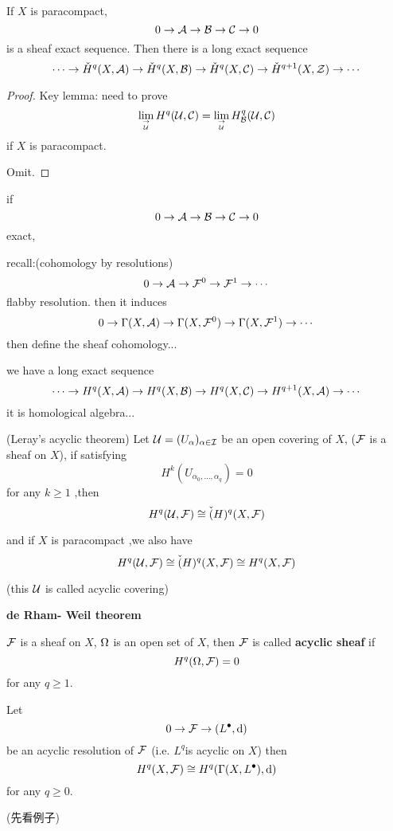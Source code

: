 \begin{thm}
If $X$ is paracompact,
$$0\to\mathcal{A}\to\mathcal{B}\to\mathcal{C}\to 0$$
is a sheaf exact sequence.
Then there is a long exact sequence
$$
\cdots\to
\check{H}^q(X,\mathcal{A})\to
\check{H}^q(X,\mathcal{B})\to
\check{H}^q(X,\mathcal{C})\to
\check{H}^{q+1}(X,\mathcal{Z})\to \cdots
$$
\end{thm}
\begin{proof}

Key lemma: need to prove
$$\lim_{\to\atop\mathcal{U}}H^q(\mathcal{U},\mathcal{C})=
\lim_{\to\atop\mathcal{U}}H^q_{\mathcal{B}}(\mathcal{U},\mathcal{C})
$$
if $X$ is paracompact.

Omit.
\end{proof}


if
$$0\to \mathcal{A}\to\mathcal{B}\to\mathcal{C}\to 0$$
exact,

recall:(cohomology by resolutions)
$$
0\to\mathcal{A}\to\mathcal{F}^0\to\mathcal{F}^1\to\cdots
$$
flabby resolution. then it induces
$$0\to\Gamma(X,\mathcal{A})\to\Gamma(X,\mathcal{F}^0)\to\Gamma(X,\mathcal{F}^1)\to\cdots$$
then define the sheaf cohomology...

we have a long exact sequence
$$
\cdots\to H^q(X,\mathcal{A})\to H^q(X,\mathcal{B})\to H^q(X,\mathcal{C})\to H^{q+1}(X,\mathcal{A})\to\cdots
$$
it is homological algebra...

\begin{thm}(Leray's acyclic theorem)
Let $\mathcal{U}=(U_{\alpha})_{\alpha\in\mathcal{I}}$ be an open covering of $X$,
($\mathcal{F}$ is a sheaf on $X$), if satisfying
$$H^k(U_{\alpha_0,...,\alpha_q})=0$$
for any $k \geq 1$ ,then
$$H^q(\mathcal{U},\mathcal{F})\cong \check(H)^q(X,\mathcal{F})$$

and if $X$ is paracompact ,we also have
$$H^q(\mathcal{U},\mathcal{F})\cong \check(H)^q(X,\mathcal{F})\cong H^q(X,\mathcal{F})$$

\end{thm}
(this $\mathcal{U}$ is called acyclic covering)

\textbf{de Rham- Weil theorem}
\begin{definition}
$\mathcal{F}$ is a sheaf on $X$, $\Omega$ is an open set of $X$,
then $\mathcal{F}$ is called \textbf{acyclic sheaf} if
$$H^q(\Omega,\mathcal{F})=0$$
for any $q\geq 1$.
\end{definition}

\begin{thm}
Let
$$0\to\mathcal{F}\to(L^{\bullet},\mathrm{d})$$
be an acyclic resolution of $\mathcal{F}$
(i.e. $L^q$is acyclic on $X$)
then
$$H^q(X,\mathcal{F})\cong H^q(\Gamma(X,L^{\bullet}),\mathrm{d})$$
for any $q\geq 0$.
\end{thm}

(先看例子)

